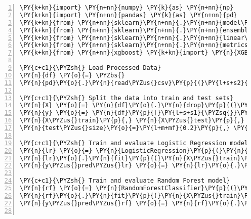 \documentclass[12pt]{article}
\begin{document}
\begin{Verbatim}[commandchars=\\\{\},numbers=left,firstnumber=1,stepnumber=1,formatcom=\footnotesize]
\PY{k+kn}{import} \PY{n+nn}{numpy} \PY{k}{as} \PY{n+nn}{np}
\PY{k+kn}{import} \PY{n+nn}{pandas} \PY{k}{as} \PY{n+nn}{pd}
\PY{k+kn}{from} \PY{n+nn}{sklearn}\PY{n+nn}{.}\PY{n+nn}{model\PYZus{}selection} \PY{k+kn}{import} \PY{n}{train\PYZus{}test\PYZus{}split}\PY{p}{,} \PY{n}{GridSearchCV}
\PY{k+kn}{from} \PY{n+nn}{sklearn}\PY{n+nn}{.}\PY{n+nn}{ensemble} \PY{k+kn}{import} \PY{n}{RandomForestClassifier}
\PY{k+kn}{from} \PY{n+nn}{sklearn}\PY{n+nn}{.}\PY{n+nn}{linear\PYZus{}model} \PY{k+kn}{import} \PY{n}{LogisticRegression}
\PY{k+kn}{from} \PY{n+nn}{sklearn}\PY{n+nn}{.}\PY{n+nn}{metrics} \PY{k+kn}{import} \PY{n}{classification\PYZus{}report}
\PY{k+kn}{from} \PY{n+nn}{xgboost} \PY{k+kn}{import} \PY{n}{XGBClassifier}

\PY{c+c1}{\PYZsh{} Load Processed Data}
\PY{n}{df} \PY{o}{=} \PYZbs{}
\PY{n}{pd}\PY{o}{.}\PY{n}{read\PYZus{}csv}\PY{p}{(}\PY{l+s+s2}{\PYZdq{}}\PY{l+s+s2}{diabetes\PYZus{}binary\PYZus{}health\PYZus{}indicators\PYZus{}BRFSS2015\PYZus{}preprocessed.csv}\PY{l+s+s2}{\PYZdq{}}\PY{p}{)}

\PY{c+c1}{\PYZsh{} Split the data into train and test sets}
\PY{n}{X} \PY{o}{=} \PY{n}{df}\PY{o}{.}\PY{n}{drop}\PY{p}{(}\PY{l+s+s1}{\PYZsq{}}\PY{l+s+s1}{Diabetes\PYZus{}binary}\PY{l+s+s1}{\PYZsq{}}\PY{p}{,} \PY{n}{axis}\PY{o}{=}\PY{l+m+mi}{1}\PY{p}{)}
\PY{n}{y} \PY{o}{=} \PY{n}{df}\PY{p}{[}\PY{l+s+s1}{\PYZsq{}}\PY{l+s+s1}{Diabetes\PYZus{}binary}\PY{l+s+s1}{\PYZsq{}}\PY{p}{]}
\PY{n}{X\PYZus{}train}\PY{p}{,} \PY{n}{X\PYZus{}test}\PY{p}{,} \PY{n}{y\PYZus{}train}\PY{p}{,} \PY{n}{y\PYZus{}test} \PY{o}{=} \PY{n}{train\PYZus{}test\PYZus{}split}\PY{p}{(}\PY{n}{X}\PY{p}{,} \PY{n}{y}\PY{p}{,} \PYZbs{}
\PY{n}{test\PYZus{}size}\PY{o}{=}\PY{l+m+mf}{0.2}\PY{p}{,} \PY{n}{random\PYZus{}state}\PY{o}{=}\PY{l+m+mi}{42}\PY{p}{)}

\PY{c+c1}{\PYZsh{} Train and evaluate Logistic Regression model}
\PY{n}{lr} \PY{o}{=} \PY{n}{LogisticRegression}\PY{p}{(}\PY{n}{max\PYZus{}iter}\PY{o}{=}\PY{l+m+mi}{1000}\PY{p}{,} \PY{n}{random\PYZus{}state}\PY{o}{=}\PY{l+m+mi}{42}\PY{p}{)}
\PY{n}{lr}\PY{o}{.}\PY{n}{fit}\PY{p}{(}\PY{n}{X\PYZus{}train}\PY{p}{,} \PY{n}{y\PYZus{}train}\PY{p}{)}
\PY{n}{y\PYZus{}pred\PYZus{}lr} \PY{o}{=} \PY{n}{lr}\PY{o}{.}\PY{n}{predict}\PY{p}{(}\PY{n}{X\PYZus{}test}\PY{p}{)}

\PY{c+c1}{\PYZsh{} Train and evaluate Random Forest model}
\PY{n}{rf} \PY{o}{=} \PY{n}{RandomForestClassifier}\PY{p}{(}\PY{n}{random\PYZus{}state}\PY{o}{=}\PY{l+m+mi}{42}\PY{p}{,} \PY{n}{n\PYZus{}jobs}\PY{o}{=}\PY{o}{\PYZhy{}}\PY{l+m+mi}{1}\PY{p}{)}
\PY{n}{rf}\PY{o}{.}\PY{n}{fit}\PY{p}{(}\PY{n}{X\PYZus{}train}\PY{p}{,} \PY{n}{y\PYZus{}train}\PY{p}{)}
\PY{n}{y\PYZus{}pred\PYZus{}rf} \PY{o}{=} \PY{n}{rf}\PY{o}{.}\PY{n}{predict}\PY{p}{(}\PY{n}{X\PYZus{}test}\PY{p}{)}


\end{Verbatim}
\end{document}
